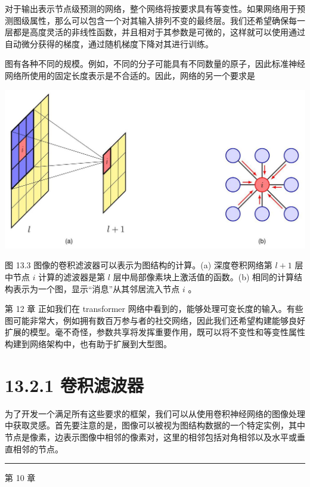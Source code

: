 \documentclass[10pt]{article}
\newcommand{\HRule}{\begin{center}\rule{0.9\linewidth}{0.2mm}\end{center}}
\begin{document}
对于输出表示节点级预测的网络，整个网络将按要求具有等变性。如果网络用于预测图级属性，那么可以包含一个对其输入排列不变的最终层。我们还希望确保每一层都是高度灵活的非线性函数，并且相对于其参数是可微的，这样就可以使用通过自动微分获得的梯度，通过随机梯度下降对其进行训练。

图有各种不同的规模。例如，不同的分子可能具有不同数量的原子，因此标准神经网络所使用的固定长度表示是不合适的。因此，网络的另一个要求是

\begin{center}
\includegraphics[max width=1.0\textwidth]{images/0194e279-9b28-703a-88f4-c3ac21e2010d_432_229_340_1339_706_0.jpg}
\end{center}
\hspace*{3em} 

图 13.3 图像的卷积滤波器可以表示为图结构的计算。(a) 深度卷积网络第 \(l + 1\) 层中节点 \(i\) 计算的滤波器是第 \(l\) 层中局部像素块上激活值的函数。(b) 相同的计算结构表示为一个图，显示“消息”从其邻居流入节点 \(i\) 。

第 12 章 正如我们在 transformer 网络中看到的，能够处理可变长度的输入。有些图可能非常大，例如拥有数百万参与者的社交网络，因此我们还希望构建能够良好扩展的模型。毫不奇怪，参数共享将发挥重要作用，既可以将不变性和等变性属性构建到网络架构中，也有助于扩展到大型图。

\section*{13.2.1 卷积滤波器}

为了开发一个满足所有这些要求的框架，我们可以从使用卷积神经网络的图像处理中获取灵感。首先要注意的是，图像可以被视为图结构数据的一个特定实例，其中节点是像素，边表示图像中相邻的像素对，这里的相邻包括对角相邻以及水平或垂直相邻的节点。

\HRule

第 10 章
\end{document}
